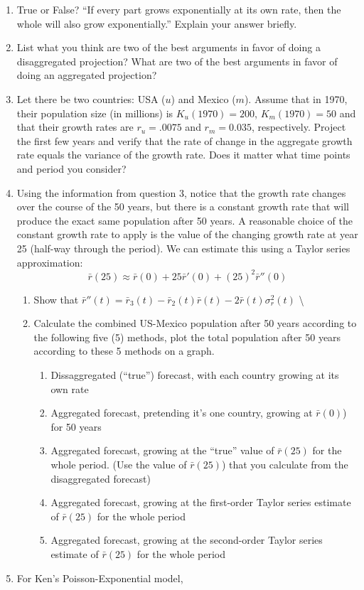 \documentclass[]{book}
\providecommand{\tightlist}{%
  \setlength{\itemsep}{0pt}\setlength{\parskip}{0pt}}
\begin{document}
\begin{enumerate}
\def\labelenumi{\arabic{enumi}.}
\item
  True or False? ``If every part grows exponentially at its own rate, then the whole will also grow exponentially.'' Explain your answer briefly.
\item
  List what you think are two of the best arguments in favor of doing a disaggregated projection? What are two of the best arguments in favor of doing an aggregated projection?
\item
  Let there be two countries: USA (\(u\)) and Mexico (\(m\)). Assume that in 1970, their population size (in millions) is \(K_u(1970) = 200\), \(K_m(1970) = 50\) and that their growth rates are \(r_u = .0075\) and \(r_m = 0.035\), respectively. Project the first few years and verify that the rate of change in the aggregate growth rate equals the variance of the growth rate. Does it matter what time points and period you consider?
\item
  Using the information from question 3, notice that the growth rate changes over the course of the 50 years, but there is a constant growth rate that will produce the exact same population after 50 years. A reasonable choice of the constant growth rate to apply is the value of the changing growth rate at year 25 (half-way through the period). We can estimate this using a Taylor series approximation: \[ \bar{r}(25) \approx \bar{r}(0) + 25\bar{r}'(0) + (25)^2 \bar{r}''(0) \]

  \begin{enumerate}
  \def\labelenumii{\alph{enumii}.}
  \tightlist
  \item
    Show that \(\bar{r}''(t) = \bar{r}_3(t) - \bar{r}_2(t) \bar{r}(t) - 2 \bar{r}(t) \sigma^2_r(t)\) \textbackslash{}
  \item
    Calculate the combined US-Mexico population after 50 years according to the following five (5) methods, plot the total population after 50 years according to these 5 methods on a graph.

    \begin{enumerate}
    \def\labelenumiii{\roman{enumiii}.}
    \tightlist
    \item
      Dissaggregated (``true'') forecast, with each country growing at its own rate
    \item
      Aggregated forecast, pretending it's one country, growing at \(\bar{r}(0)\)) for 50 years
    \item
      Aggregated forecast, growing at the ``true'' value of \(\bar{r}(25)\) for the whole period. (Use the value of \(\bar{r}(25)\)) that you calculate from the disaggregated forecast)
    \item
      Aggregated forecast, growing at the first-order Taylor series estimate of \(\bar{r}(25)\) for the whole period
    \item
      Aggregated forecast, growing at the second-order Taylor series estimate of \(\bar{r}(25)\) for the whole period
    \end{enumerate}
  \end{enumerate}
\item
  For Ken's Poisson-Exponential model,


\end{enumerate}
\end{document}
